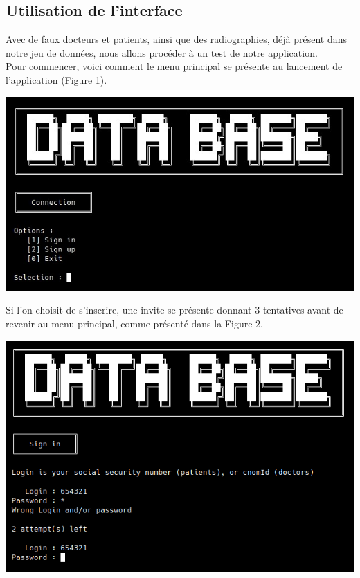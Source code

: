 \documentclass[12pt,a4paper]{article}
\newenvironment{Figure}
{\par\medskip\noindent\minipage{\linewidth}}
{\endminipage\par\medskip}
\begin{document}
	\pagebreak




	\begin{multicols}{2}
		
		\section{Utilisation de l'interface}
				
		Avec de faux docteurs et patients, ainsi que des radiographies, déjà présent dans notre jeu de données, nous allons procéder à un test de notre application. \\
				
		Pour commencer, voici comment le menu principal se présente au lancement de l'application (Figure 1). \\
		\begin{Figure}
			\centering
			\includegraphics[width=\linewidth]{images/walkthrough/entree.jpg}
			\label{fig:menu_principal}
		\end{Figure}
				
		Si l'on choisit de s'inscrire, une invite se présente donnant 3 tentatives avant de revenir au menu principal, comme présenté dans la Figure 2.
				

		\begin{Figure}
			\centering
			\includegraphics[width=\linewidth]{images/walkthrough/sign_in.png}
			\label{fig:page_connexion}
		\end{Figure}		


\end{multicols}
\end{document}

